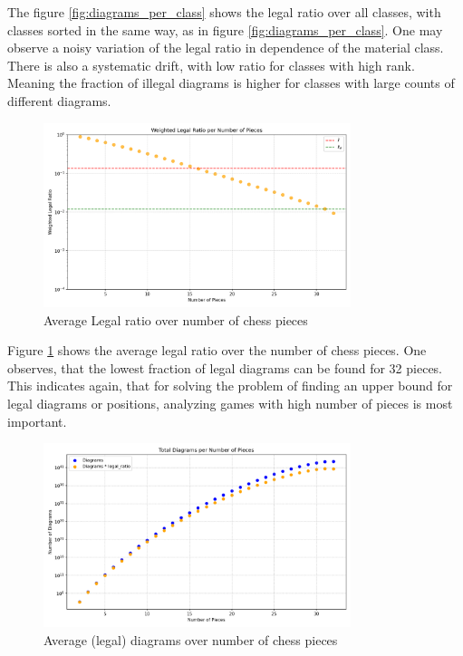 \documentclass[12pt]{article}
\begin{document}
The figure \ref{fig:diagrams_per_class} shows the legal ratio over all classes, with classes sorted in the same way, as in figure \ref{fig:diagrams_per_class}. One may observe a noisy variation of the legal ratio in dependence of the material class. There is also a systematic drift, with low ratio for classes with high rank. Meaning the fraction of illegal diagrams is higher for classes with large counts of different diagrams.


\begin{figure}[h!]
  \centering
  \includegraphics[width=0.8\textwidth]{legal_ratio_per_num_pieces.png}
  \caption{Average Legal ratio over number of chess pieces}
  \label{fig:legal_ratio_by_pieces}
\end{figure}
Figure \ref{fig:legal_ratio_by_pieces} shows the average legal ratio over the number of chess pieces. One observes, that the lowest fraction of legal diagrams can be found for 32 pieces. This indicates again, that for solving the problem of finding an upper bound for legal diagrams or positions, analyzing games with high number of pieces is most important.
\begin{figure}[h!]
  \centering
  \includegraphics[width=0.8\textwidth]{diagrams_per_num_pieces.png}
  \caption{Average (legal) diagrams over number of chess pieces}
  \label{fig:diagrams_by_pieces}
\end{figure}
\end{document}

